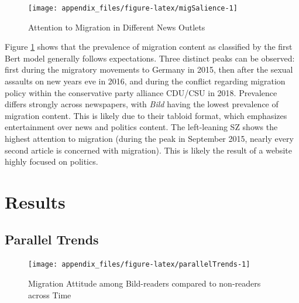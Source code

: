 \documentclass[
]{article}
\begin{document}
\begin{figure}[!htp]

{\centering \texttt{[image: appendix\_files/figure-latex/migSalience-1]} 

}

\caption{Attention to Migration in Different News Outlets}\label{fig:migSalience}
\end{figure}

Figure \ref{fig:migSalience} shows that the prevalence of migration content as classified by the first Bert model generally follows expectations. Three distinct peaks can be observed: first during the migratory movements to Germany in 2015, then after the sexual assaults on new years eve in 2016, and during the conflict regarding migration policy within the conservative party alliance CDU/CSU in 2018. Prevalence differs strongly across newspapers, with \emph{Bild} having the lowest prevalence of migration content. This is likely due to their tabloid format, which emphasizes entertainment over news and politics content. The left-leaning SZ shows the highest attention to migration (during the peak in September 2015, nearly every second article is concerned with migration). This is likely the result of a website highly focused on politics.

\pagebreak

\hypertarget{results}{%
\section{Results}\label{results}}

\hypertarget{parallel-trends}{%
\subsection{Parallel Trends}\label{parallel-trends}}

\begin{figure}[!htp]

{\centering \texttt{[image: appendix\_files/figure-latex/parallelTrends-1]} 

}

\caption{Migration Attitude among Bild-readers compared to non-readers across Time}\label{fig:parallelTrends}
\end{figure}
\end{document}
